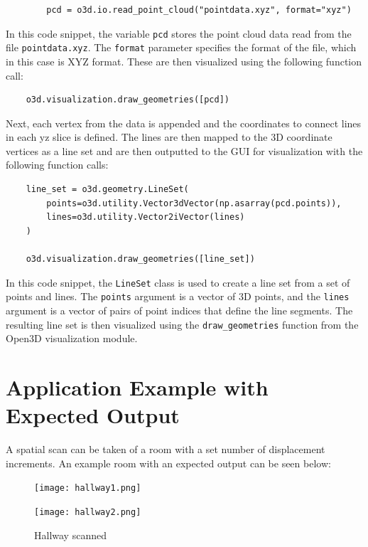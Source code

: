 \documentclass[12pt, letterpaper]{article}
\begin{document}
{\fontsize{10pt}{12pt}\selectfont %
    \ttfamily %
    \begin{verbatim}
        pcd = o3d.io.read_point_cloud("pointdata.xyz", format="xyz")

    \end{verbatim}
}
In this code snippet, the variable \verb|pcd| stores the point cloud data read from the file \verb|pointdata.xyz|. The \verb|format| parameter specifies the format of the file, which in this case is XYZ format. 
These are then visualized using the following function call:
{\fontsize{10pt}{12pt}\selectfont %
    \ttfamily %
    \begin{verbatim}
    o3d.visualization.draw_geometries([pcd])
    \end{verbatim}
}
Next, each vertex from the data is appended and the coordinates to connect lines in each yz slice is defined. The lines are then mapped to the 3D coordinate vertices as a line set and are then outputted to the GUI for visualization with the following function calls:
{\fontsize{10pt}{12pt}\selectfont %
    \ttfamily %
    \begin{verbatim}
    line_set = o3d.geometry.LineSet(
        points=o3d.utility.Vector3dVector(np.asarray(pcd.points)),
        lines=o3d.utility.Vector2iVector(lines)
    )

    o3d.visualization.draw_geometries([line_set])
    \end{verbatim}
}

In this code snippet, the \verb|LineSet| class is used to create a line set from a set of points and lines. The \verb|points| argument is a vector of 3D points, and the \verb|lines| argument is a vector of pairs of point indices that define the line segments. The resulting line set is then visualized using the \verb|draw_geometries| function from the Open3D visualization module.

\section{Application Example with Expected Output}

A spatial scan can be taken of a room with a set number of displacement increments. An example room with an expected output can be seen below:

\begin{figure}[htbp]
\centering
\begin{minipage}{0.48\textwidth}
\centering
\texttt{[image: hallway1.png]}
\label{fig:hallway1}
\end{minipage}
\hfill
\begin{minipage}{0.48\textwidth}
\centering
\texttt{[image: hallway2.png]}
\label{fig:hallway2}
\end{minipage}
\caption{Hallway scanned}
\label{fig:hallways}
\end{figure}
\end{document}
